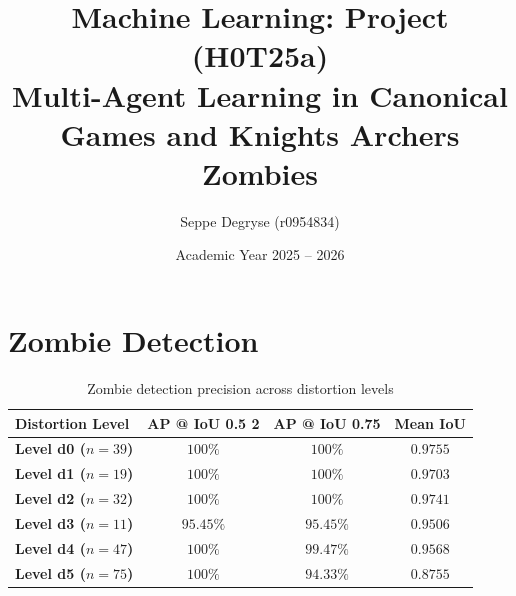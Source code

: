 \documentclass[11pt,a4paper]{article}
\title{Machine Learning: Project (H0T25a)\\ \normalsize Multi-Agent Learning in Canonical Games and Knights Archers Zombies}
\author{Seppe Degryse (r0954834)}
\date{Academic Year 2025 -- 2026}
\begin{document}
\maketitle

\section{Zombie Detection}


\begin{table}[htpb]
    \centering
    \begin{tabular}{l | c | c | c}
        \hline
        Distortion Level & AP @ IoU 0.5 2 & AP @ IoU 0.75 & Mean IoU \\
        \hline
        \textbf{Level d0 ($n=39$)} & $100\%$ & $100\%$ & $0.9755$ \\
        \textbf{Level d1 ($n=19$)} & $100\%$ & $100\%$ & $0.9703$ \\
        \textbf{Level d2 ($n=32$)} & $100\%$ & $100\%$ & $0.9741$ \\
        \textbf{Level d3 ($n=11$)} & $95.45\%$ & $95.45\%$ & $0.9506$ \\
        \textbf{Level d4 ($n=47$)} & $100\%$ & $99.47\%$ & $0.9568$ \\
        \textbf{Level d5 ($n=75$)} & $100\%$ & $94.33\%$ & $0.8755$ \\
    \end{tabular}
    \caption{Zombie detection precision across distortion levels}
    \label{tab:label}
\end{table}
\end{document}
